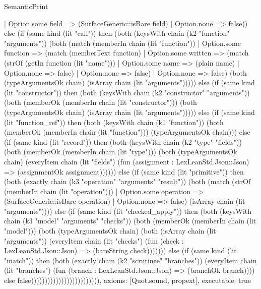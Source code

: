 \begin{lexlean}{SemanticPrint}
\begin{semanticmodule}
{      | Option.some field => (SurfaceGeneric::isBare field)
      | Option.none => false)) else (if (same kind (lit "call")) then (both (keysWith chain (k2 "function" "arguments")) (both (match (memberIn chain (lit "function"))
      | Option.some function => (match (memberText function)
        | Option.some written => (match (strOf (getIn function (lit "name")))
          | Option.some name => (plain name)
          | Option.none => false)
        | Option.none => false)
      | Option.none => false) (both (typeArgumentsOk chain) (isArray chain (lit "arguments"))))) else (if (same kind (lit "constructor")) then (both (keysWith chain (k2 "constructor" "arguments")) (both (memberOk (memberIn chain (lit "constructor"))) (both (typeArgumentsOk chain) (isArray chain (lit "arguments"))))) else (if (same kind (lit "function_ref")) then (both (keysWith chain (k1 "function")) (both (memberOk (memberIn chain (lit "function"))) (typeArgumentsOk chain))) else (if (same kind (lit "record")) then (both (keysWith chain (k2 "type" "fields")) (both (memberOk (memberIn chain (lit "type"))) (both (typeArgumentsOk chain) (everyItem chain (lit "fields") (fun (assignment : LexLeanStd.Json::Json) => (assignmentOk assignment)))))) else (if (same kind (lit "primitive")) then (both (exactly chain (k3 "operation" "arguments" "result")) (both (match (strOf (memberIn chain (lit "operation")))
      | Option.some operation => (SurfaceGeneric::isBare operation)
      | Option.none => false) (isArray chain (lit "arguments")))) else (if (same kind (lit "checked_apply")) then (both (keysWith chain (k3 "model" "arguments" "checks")) (both (memberOk (memberIn chain (lit "model"))) (both (typeArgumentsOk chain) (both (isArray chain (lit "arguments")) (everyItem chain (lit "checks") (fun (check : LexLeanStd.Json::Json) => (bareString check))))))) else (if (same kind (lit "match")) then (both (exactly chain (k2 "scrutinee" "branches")) (everyItem chain (lit "branches") (fun (branch : LexLeanStd.Json::Json) => (branchOk branch)))) else false))))))))))))))))))))))))),
  axioms: [Quot.sound, propext],
  executable: true
}


\end{semanticmodule}
\end{lexlean}
